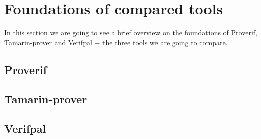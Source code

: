 
\section{Foundations of compared tools}
\label{section:foundations-of-compared-tools}

In this section we are going to see a brief overview on the foundations of Proverif, Tamarin-prover and Verifpal $-$ the three tools we are going to compare.

\subsection{Proverif}


\subsection{Tamarin-prover}


\subsection{Verifpal}


